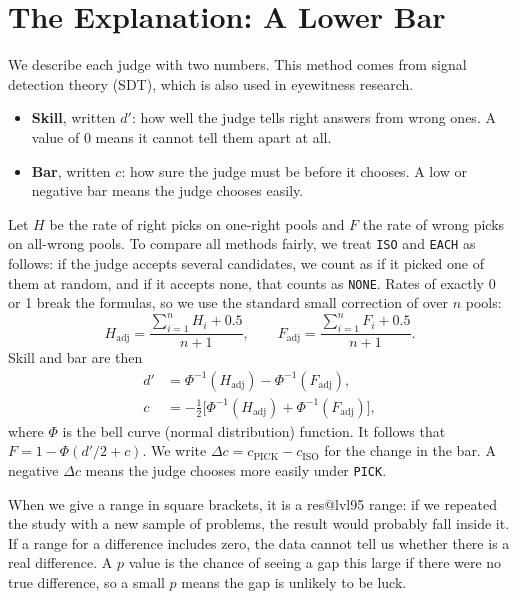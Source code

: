 \documentclass[10pt,twocolumn]{article}
\makeatletter
\newcommand{\res}[1]{\csname res@#1\endcsname}
\makeatother
\begin{document}
\section{The Explanation: A Lower Bar}
\label{sec:account}
We describe each judge with two numbers. This method comes from signal detection theory (SDT), which is also used in eyewitness research.
\begin{itemize}\setlength{\itemsep}{1pt}
\item \textbf{Skill}, written $d'$: how well the judge tells right answers from wrong ones. A value of 0 means it cannot tell them apart at all.
\item \textbf{Bar}, written $c$: how sure the judge must be before it chooses. A low or negative bar means the judge chooses easily.
\end{itemize}

Let $H$ be the rate of right picks on one-right pools and $F$ the rate of wrong picks on all-wrong pools. To compare all methods fairly, we treat \texttt{ISO} and \texttt{EACH} as follows: if the judge accepts several candidates, we count as if it picked one of them at random, and if it accepts none, that counts as \texttt{NONE}. Rates of exactly 0 or 1 break the formulas, so we use the standard small correction of \citet{hautus1995corrections} over $n$ pools:
\begin{equation}
H_{\mathrm{adj}} = \frac{\sum_{i=1}^n H_i + 0.5}{n + 1}, \qquad F_{\mathrm{adj}} = \frac{\sum_{i=1}^n F_i + 0.5}{n + 1}.
\end{equation}
Skill and bar are then
\begin{align}
d' &= \Phi^{-1}(H_{\mathrm{adj}}) - \Phi^{-1}(F_{\mathrm{adj}}), \nonumber \\
c  &= -\tfrac{1}{2}\bigl[\Phi^{-1}(H_{\mathrm{adj}}) + \Phi^{-1}(F_{\mathrm{adj}})\bigr],
\end{align}
where $\Phi$ is the bell curve (normal distribution) function. It follows that $F = 1 - \Phi(d'/2 + c)$. We write $\Delta c = c_{\mathrm{PICK}} - c_{\mathrm{ISO}}$ for the change in the bar. A negative $\Delta c$ means the judge chooses more easily under \texttt{PICK}.

When we give a range in square brackets, it is a \res{lvl95} range: if we repeated the study with a new sample of problems, the result would probably fall inside it. If a range for a difference includes zero, the data cannot tell us whether there is a real difference. A $p$ value is the chance of seeing a gap this large if there were no true difference, so a small $p$ means the gap is unlikely to be luck.
\end{document}
